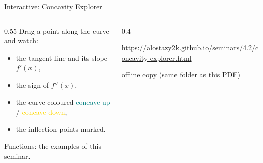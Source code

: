 \documentclass[aspectratio=169,11pt]{beamer}
\begin{document}
\begin{frame}[t]{Interactive: Concavity Explorer}
  \vspace{0.2cm}
  \begin{columns}[T]
  \begin{column}{0.55\textwidth}\small
    Drag a point along the curve and watch:
    \begin{itemize}\setlength{\itemsep}{0.15cm}
      \item the tangent line and its slope $f'(x)$,
      \item the sign of $f''(x)$,
      \item the curve coloured \textcolor{teal}{concave up} / \textcolor{gold}{concave down},
      \item the inflection points marked.
    \end{itemize}
    Functions: the examples of this seminar.
  \end{column}
  \begin{column}{0.4\textwidth}\centering
    \vspace{0.4cm}
    \href{https://alostazy2k.github.io/seminars/4.2/concavity-explorer.html}{}\par\vspace{0.3cm}
    {\tiny\color{muted}\url{https://alostazy2k.github.io/seminars/4.2/concavity-explorer.html}}\par\vspace{0.25cm}
    {\scriptsize\href{run:concavity-explorer.html}{\color{teal}\underline{offline copy (same folder as this PDF)}}}
  \end{column}
  \end{columns}
\end{frame}
\end{document}
